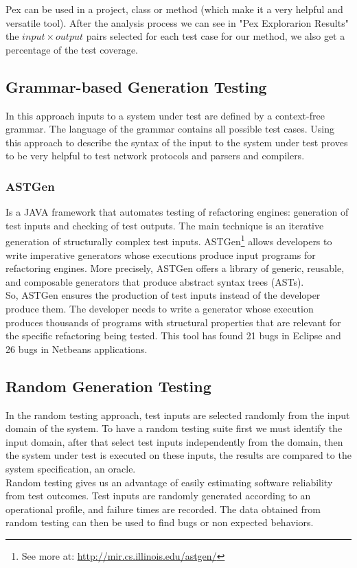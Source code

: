 \documentclass[10pt, conference, compsocconf]{IEEEtran}
\begin{document}
Pex can be used in a project, class or method (which make it a very helpful and versatile tool). After the analysis process we can see in "Pex Explorarion Results"
the $input \times output$ pairs selected for each test case for our method, we also get a percentage of the test coverage.

\subsection{Grammar-based Generation Testing}
In this approach inputs to a system under test are defined by a context-free grammar. The language of the grammar contains all possible test cases.
Using this approach to describe the syntax of the input to the system under test proves to be very helpful to test
network protocols\cite{tal:syntax-based,kaksonen2001functional} and parsers and compilers\cite{1994-burgess,Burgess_Saidi_1996}.

\subsubsection{\textbf{ASTGen}\cite{Daniel:2007:ATR:1287624.1287651}} Is a JAVA framework that automates testing of refactoring engines: generation of test inputs
and checking of test outputs. The main technique is an iterative generation of structurally complex test inputs.
ASTGen\footnote{See more at: \url{http://mir.cs.illinois.edu/astgen/}} allows developers to write imperative generators whose executions
produce input programs for refactoring engines. More precisely, ASTGen
offers a library of generic, reusable, and composable generators that produce abstract syntax trees (ASTs).\\
So, ASTGen ensures the production of test inputs instead of the developer produce them. The developer needs to write a generator whose execution
produces thousands of programs with structural properties that are relevant for the specific refactoring being tested. This tool has found
21 bugs in Eclipse and 26 bugs in Netbeans applications.

\subsection{Random Generation Testing}
In the random testing approach, test inputs are selected randomly from the input domain of the system.
To have a random testing suite first we must identify the input domain, after that select test inputs independently from the domain,
then the system under test is executed on these inputs, the results are compared to the system specification, an oracle.\\
Random testing gives us an advantage of easily estimating software reliability from test outcomes.
Test inputs are randomly generated according to an operational profile, and failure times are recorded.
The data obtained from random testing can then be used to find bugs or non expected behaviors.\\
\end{document}
